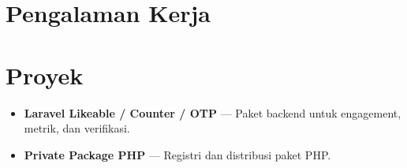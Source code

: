 \documentclass[11pt,a4paper]{article}
\begin{document}

\section*{Pengalaman Kerja}

\section*{Proyek}
\begin{itemize}
  \item \textbf{Laravel Likeable / Counter / OTP} --- Paket backend untuk engagement, metrik, dan verifikasi.
  \item \textbf{Private Package PHP} --- Registri dan distribusi paket PHP.
\end{itemize}

\end{document}
